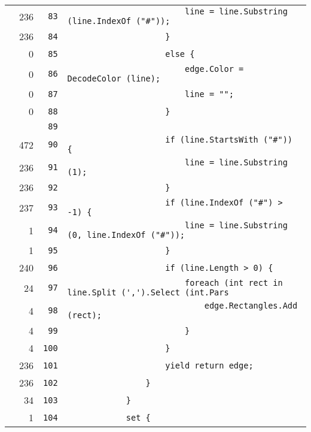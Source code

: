 \documentclass[a4paper,10pt]{article}
\begin{document}
\begin{longtable}[l]{lrrl}
\cellcolor{green} & 236 & \verb~83~ & \verb~                        line = line.Substring (line.IndexOf ("#"));~\\
\cellcolor{green} & 236 & \verb~84~ & \verb~                    }~\\
\cellcolor{red} & 0 & \verb~85~ & \verb~                    else {~\\
\cellcolor{red} & 0 & \verb~86~ & \verb~                        edge.Color = DecodeColor (line);~\\
\cellcolor{red} & 0 & \verb~87~ & \verb~                        line = "";~\\
\cellcolor{red} & 0 & \verb~88~ & \verb~                    }~\\
\cellcolor{gray} &  & \verb~89~ & \verb~~\\
\cellcolor{green} & 472 & \verb~90~ & \verb~                    if (line.StartsWith ("#")) {~\\
\cellcolor{green} & 236 & \verb~91~ & \verb~                        line = line.Substring (1);~\\
\cellcolor{green} & 236 & \verb~92~ & \verb~                    }~\\
\cellcolor{green} & 237 & \verb~93~ & \verb~                    if (line.IndexOf ("#") > -1) {~\\
\cellcolor{green} & 1 & \verb~94~ & \verb~                        line = line.Substring (0, line.IndexOf ("#"));~\\
\cellcolor{green} & 1 & \verb~95~ & \verb~                    }~\\
\cellcolor{green} & 240 & \verb~96~ & \verb~                    if (line.Length > 0) {~\\
\cellcolor{green} & 24 & \verb~97~ & \verb~                        foreach (int rect in line.Split (',').Select (int.Pars~\\
\cellcolor{green} & 4 & \verb~98~ & \verb~                            edge.Rectangles.Add (rect);~\\
\cellcolor{green} & 4 & \verb~99~ & \verb~                        }~\\
\cellcolor{green} & 4 & \verb~100~ & \verb~                    }~\\
\cellcolor{green} & 236 & \verb~101~ & \verb~                    yield return edge;~\\
\cellcolor{green} & 236 & \verb~102~ & \verb~                }~\\
\cellcolor{green} & 34 & \verb~103~ & \verb~            }~\\
\cellcolor{green} & 1 & \verb~104~ & \verb~            set {~\\

\end{longtable}
\end{document}
